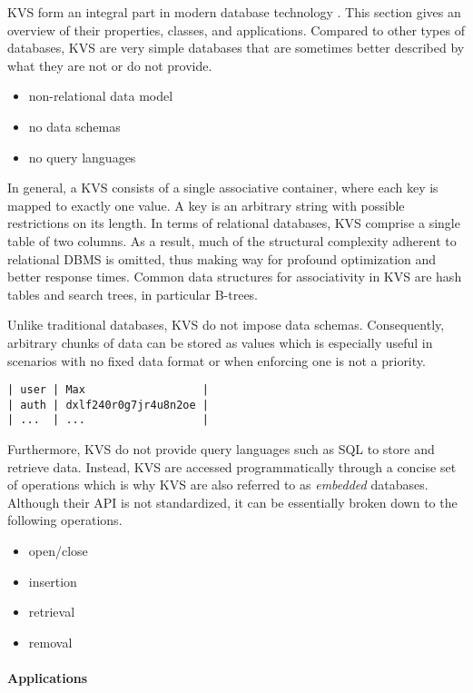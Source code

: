 KVS form an integral part in modern database technology \cite{fiebig2016one}.
This section gives an overview of their properties, classes, and applications.
Compared to other types of databases, KVS are very simple databases that are
sometimes better described by what they are not or do not provide.

\begin{itemize}
    \item non-relational data model
    \item no data schemas
    \item no query languages
\end{itemize}

In general, a KVS consists of a single associative container, where each key is
mapped to exactly one value. A key is an arbitrary string with possible
restrictions on its length. In terms of relational databases, KVS comprise a
single table of two columns. As a result, much of the structural complexity
adherent to relational DBMS is omitted, thus making way for profound
optimization and better response times. Common data structures for associativity
in KVS are hash tables and search trees, in particular B-trees.

Unlike traditional databases, KVS do not impose data schemas. Consequently,
arbitrary chunks of data can be stored as values which is especially useful
in scenarios with no fixed data format or when enforcing one is not a priority.

\begin{lstlisting}
| user | Max                  |
| auth | dxlf240r0g7jr4u8n2oe |
| ...  | ...                  |
\end{lstlisting}

Furthermore, KVS do not provide query languages such as SQL to
store and retrieve data. Instead, KVS are accessed programmatically through a
concise set of operations which is why KVS are also referred to as
\emph{embedded} databases. Although their API is not standardized, it can be
essentially broken down to the following operations.

\begin{itemize}
    \item open/close
    \item insertion
    \item retrieval
    \item removal
\end{itemize}

\paragraph{Applications}

